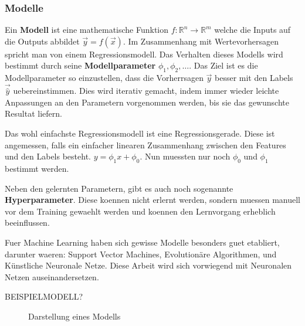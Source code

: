 \documentclass[../main]{subfiles}
\begin{document}
\subsubsection{Modelle}
Ein \textbf{Modell} ist eine mathematische Funktion $\mathit{f}\colon \mathbb{R}^n \to \mathbb{R}^m$ welche die Inputs auf die Outputs abbildet $\vec{y}=\mathit{f}(\vec{x})$.
Im Zusammenhang mit Wertevorhersagen spricht man von einem Regressionsmodell.
Das Verhalten dieses Modells wird bestimmt durch seine \textbf{Modellparameter} $\phi_1, \phi_2,\ldots$.
Das Ziel ist es die Modellparameter so einzustellen, dass die Vorherrsagen $\vec{y}$ besser mit den Labels $\vec{\hat{y}}$ uebereinstimmen.
Dies wird iterativ gemacht, indem immer wieder leichte Anpassungen an den Parametern vorgenommen werden, bis sie das gewunschte Resultat liefern.
\par\medskip
Das wohl einfachste Regressionsmodell ist eine Regressionsgerade. Diese ist angemessen, falls ein einfacher linearen Zusammenhang zwischen den Features und den Labels besteht.
$y=\phi_1x + \phi_0$. Nun muessten nur noch $\phi_0$ und $\phi_1$ bestimmt werden.

Neben den gelernten Parametern, gibt es auch noch sogenannte \textbf{Hyperparameter}.
Diese koennen nicht erlernt werden, sondern muessen manuell vor dem Training gewaehlt werden und koennen den Lernvorgang erheblich beeinflussen.
\par\medskip
Fuer Machine Learning haben sich gewisse Modelle besonders guet etabliert,
darunter waeren: Support Vector Machines, Evolutionäre Algorithmen, und Künstliche Neuronale Netze.
Diese Arbeit wird sich vorwiegend mit Neuronalen Netzen auseinandersetzen.
\par\medskip
BEISPIELMODELL?

\begin{figure}[h!]
  \centering


  \caption{Darstellung eines Modells}
\end{figure}
\end{document}
